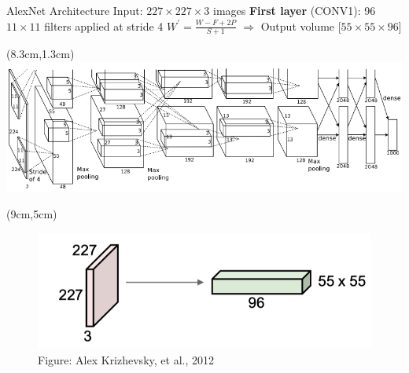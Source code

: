 \documentclass[serif, aspectratio=169]{beamer}
\begin{document}
\begin{frame}{AlexNet Architecture}
	\vspace{0.5cm}
	Input: $227 \times 227 \times 3$ images \vspace{0.3cm} \newline
	\textbf{First layer} (CONV1): 96 $11 \times 11$ filters applied at stride 4 \hspace{2cm} $W^{\prime} = \frac{W - F + 2P}{S + 1}$ \newline 
	$\Rightarrow$ Output volume [$55 \times 55 \times 96$]

	\begin{textblock*}{5cm}(8.3cm,1.3cm) %
		\includegraphics[keepaspectratio, scale=0.25]{pic/alexnet}
	\end{textblock*}
	\begin{textblock*}{6cm}(9cm,5cm) %
		\begin{figure}
			\includegraphics[keepaspectratio, scale=0.25]{pic/cnn_layer}
			\vspace{-2em}
			\caption*{\hspace{1cm} {\scriptsize Figure: Alex Krizhevsky, et al., 2012}}
		\end{figure}

	\end{textblock*}
\end{frame}
\end{document}
